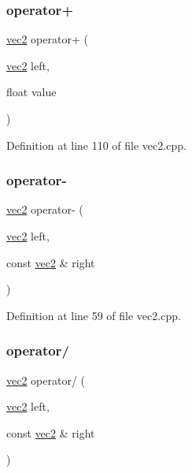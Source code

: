 \subsubsection{\texorpdfstring{operator+}{operator+}\hspace{0.1cm}{\footnotesize\ttfamily [2/2]}}
{\footnotesize\ttfamily \hyperlink{structspork_1_1maths_1_1vec2}{vec2} operator+ (\begin{DoxyParamCaption}\item[{\hyperlink{structspork_1_1maths_1_1vec2}{vec2}}]{left,  }\item[{float}]{value }\end{DoxyParamCaption})\hspace{0.3cm}{\ttfamily [friend]}}



Definition at line 110 of file vec2.\+cpp.

\mbox{\label{structspork_1_1maths_1_1vec2_adfffcea694a076d10b3b734c0c149062}} 
\subsubsection{\texorpdfstring{operator-\/}{operator-}}
{\footnotesize\ttfamily \hyperlink{structspork_1_1maths_1_1vec2}{vec2} operator-\/ (\begin{DoxyParamCaption}\item[{\hyperlink{structspork_1_1maths_1_1vec2}{vec2}}]{left,  }\item[{const \hyperlink{structspork_1_1maths_1_1vec2}{vec2} \&}]{right }\end{DoxyParamCaption})\hspace{0.3cm}{\ttfamily [friend]}}



Definition at line 59 of file vec2.\+cpp.

\mbox{\label{structspork_1_1maths_1_1vec2_a73f8d7dee179a44d9f7e23c167467088}} 
\subsubsection{\texorpdfstring{operator/}{operator/}}
{\footnotesize\ttfamily \hyperlink{structspork_1_1maths_1_1vec2}{vec2} operator/ (\begin{DoxyParamCaption}\item[{\hyperlink{structspork_1_1maths_1_1vec2}{vec2}}]{left,  }\item[{const \hyperlink{structspork_1_1maths_1_1vec2}{vec2} \&}]{right }\end{DoxyParamCaption})\hspace{0.3cm}{\ttfamily [friend]}}



